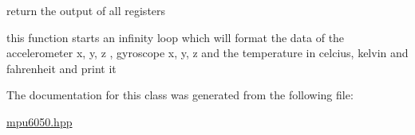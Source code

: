 return the output of all registers 

this function starts an infinity loop which will format the data of the accelerometer x, y, z , gyroscope x, y, z and the temperature in celcius, kelvin and fahrenheit and print it 

The documentation for this class was generated from the following file\+:\begin{DoxyCompactItemize}
\item 
\hyperlink{mpu6050_8hpp}{mpu6050.\+hpp}\end{DoxyCompactItemize}
